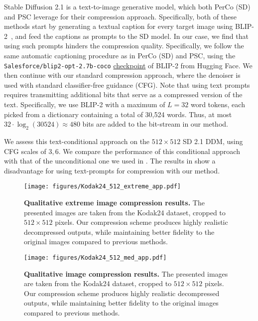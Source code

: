 Stable Diffusion 2.1 is a text-to-image generative model, which both PerCo (SD) and PSC leverage for their compression approach.
Specifically, both of these methods start by generating a textual caption for every target image using BLIP-2~\citep{li2023blip}, and feed the captions as prompts to the SD model.
In our case, we find that using such prompts hinders the compression quality.
Specifically, we follow the same automatic captioning procedure as in PerCo (SD) and PSC, using the \texttt{Salesforce/blip2-opt-2.7b-coco} \href{https://huggingface.co/Salesforce/blip2-opt-2.7b-coco}{checkpoint} of BLIP-2 from Hugging Face.
We then continue with our standard compression approach, where the denoiser is used with standard classifier-free guidance (CFG).
Note that using text prompts requires transmitting additional bits that serve as a compressed version of the text.
Specifically, we use BLIP-2 with a maximum of $L=32$ word tokens, each picked from a dictionary containing a total of 30,524 words.
Thus, at most $32\cdot\log_{2}(30524)\approx 480$ bits are added to the bit-stream in our method.

We assess this text-conditional approach on the $512\times 512$ SD 2.1 DDM, using CFG scales of $3,6$.
We compare the performance of this conditional approach with that of the unconditional one we used in .
The results in  show a disadvantage for using text-prompts for compression with our method.

\begin{figure*}[t]
    \centering
    \texttt{[image: figures/Kodak24\_512\_extreme\_app.pdf]}
    \caption{\textbf{Qualitative extreme image compression results.} The presented images are taken from the Kodak24 dataset, cropped to $512\times512$ pixels.
    Our compression scheme produces highly realistic decompressed outputs, while maintaining better fidelity to the original images compared to previous methods.
    }
    \label{fig:compression_examples_app}
\end{figure*}


\begin{figure*}[t]
    \centering
    \texttt{[image: figures/Kodak24\_512\_med\_app.pdf]}
    \caption{
    \textbf{Qualitative image compression results.} The presented images are taken from the Kodak24 dataset, cropped to $512\times512$ pixels.
    Our compression scheme produces highly realistic decompressed outputs, while maintaining better fidelity to the original images compared to previous methods.
    }\label{fig:compression_examples_app_medium}
\end{figure*}

